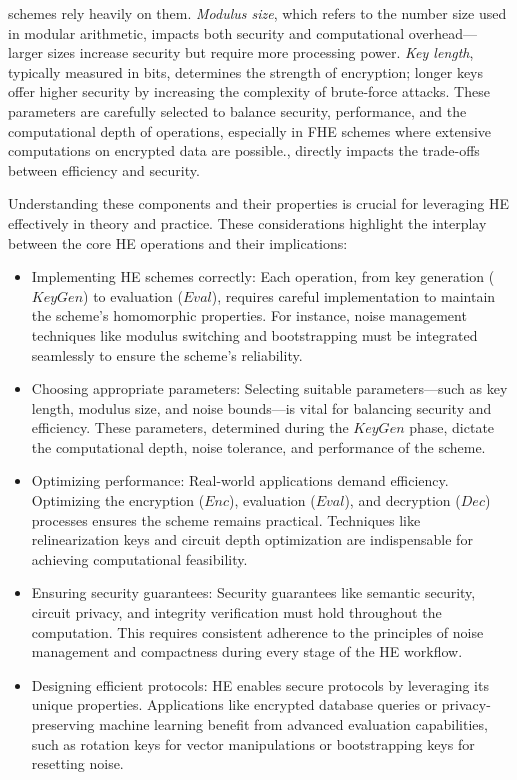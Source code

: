 \documentclass[
  letterpaper,
  DIV=11,
  numbers=noendperiod,
  oneside]{scrartcl}
\begin{document}
\begin{itemize}
{    schemes rely heavily on them. \emph{Modulus size}, which refers to
    the number size used in modular arithmetic, impacts both security
    and computational overhead---larger sizes increase security but
    require more processing power. \emph{Key length}, typically measured
    in bits, determines the strength of encryption; longer keys offer
    higher security by increasing the complexity of brute-force attacks.
    These parameters are carefully selected to balance security,
    performance, and the computational depth of operations, especially
    in FHE schemes where extensive computations on encrypted data are
    possible.}, directly impacts the trade-offs between efficiency and
  security.
\end{itemize}

Understanding these components and their properties is crucial for
leveraging HE effectively in theory and practice. These considerations
highlight the interplay between the core HE operations and their
implications:

\begin{itemize}
\item
  Implementing HE schemes correctly: Each operation, from key generation
  (\(KeyGen\)) to evaluation (\(Eval\)), requires careful implementation
  to maintain the scheme's homomorphic properties. For instance, noise
  management techniques like modulus switching and bootstrapping must be
  integrated seamlessly to ensure the scheme's reliability.
\item
  Choosing appropriate parameters: Selecting suitable parameters---such
  as key length, modulus size, and noise bounds---is vital for balancing
  security and efficiency. These parameters, determined during the
  \(KeyGen\) phase, dictate the computational depth, noise tolerance,
  and performance of the scheme.
\item
  Optimizing performance: Real-world applications demand efficiency.
  Optimizing the encryption (\(Enc\)), evaluation (\(Eval\)), and
  decryption (\(Dec\)) processes ensures the scheme remains practical.
  Techniques like relinearization keys and circuit depth optimization
  are indispensable for achieving computational feasibility.
\item
  Ensuring security guarantees: Security guarantees like semantic
  security, circuit privacy, and integrity verification must hold
  throughout the computation. This requires consistent adherence to the
  principles of noise management and compactness during every stage of
  the HE workflow.
\item
  Designing efficient protocols: HE enables secure protocols by
  leveraging its unique properties. Applications like encrypted database
  queries or privacy-preserving machine learning benefit from advanced
  evaluation capabilities, such as rotation keys for vector
  manipulations or bootstrapping keys for resetting noise.
\end{itemize}
\end{document}

